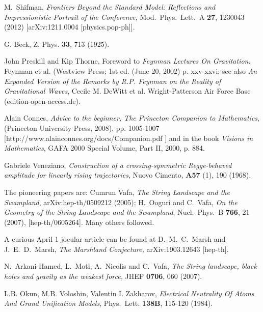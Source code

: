 \documentclass[epsfig,12pt]{article}
\begin{document}
\newpage







\begin{thebibliography}{99}

{\small 

 M.~Shifman,
{\em Frontiers Beyond the Standard Model: Reflections and Impressionistic Portrait of the Conference,}
  Mod.\ Phys.\ Lett.\ A {\bf 27}, 1230043 (2012)
  [arXiv:1211.0004 [physics.pop-ph]].
  
G. Beck, Z. Phys. {\bf 33}, 713 (1925).

John  Preskill and Kip Thorne, Foreword to {\sl Feynman Lectures On Gravitation}. Feynman et al. (Westview Press; 1st ed. (June 20, 2002) p. xxv-xxvi; see also  {\sl An Expanded Version of the Remarks by R.P. Feynman on the Reality of Gravitational Waves},  Cecile M. DeWitt et al. Wright-Patterson Air Force Base (edition-open-access.de).

 Alain Connes, {\sl Advice to the beginner,  The Princeton Companion to Mathematics}, (Princeton University Press, 2008), pp.
1005-1007 [http://www.alainconnes.org/docs/Companion.pdf ] and 
in the book {\sl Visions in Mathematics},  GAFA 2000 Special Volume, Part II, 2000,
p. 884.

Gabriele Veneziano,  {\em Construction of a crossing-symmetric Regge-beha\-ved amplitude for linearly rising trajectories},  Nuovo Cimento,  {\bf A57} (1), 190 (1968).

 The pioneering papers are: Cumrun  Vafa,  {\em The String Landscape and the Swampland},  arXiv:hep-th/0509212 (2005);
  H.~Ooguri and C.~Vafa,
 {\em On the Geometry of the String Landscape and the Swampland},
  Nucl.\ Phys.\ B {\bf 766}, 21 (2007), 
[hep-th/0605264]. Many others followed.

A curious April 1 jocular article can be found at  D.~M.~C.~Marsh and J.~E.~D.~Marsh,
{\em The Marshland Conjecture,}
  arXiv:1903.12643 [hep-th].


N.~Arkani-Hamed, L.~Motl, A.~Nicolis and C.~Vafa,
{\em The String landscape, black holes and gravity as the weakest force,}
  JHEP {\bf 0706}, 060 (2007).
  
L.B. Okun, M.B. Voloshin, Valentin I. Zakharov, {\em Electrical Neutrality Of Atoms And Grand Unification Models}, 
 Phys.\ Lett. {\bf 138B}, 115-120 (1984). 
  
}
\end{thebibliography}
\end{document}
